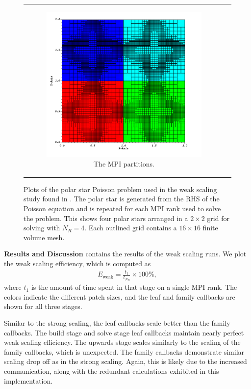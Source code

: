 \begin{figure}
\begin{tabular}{c c}
\begin{subfigure}[t]{0.45\textwidth}
            \includegraphics[width=\textwidth, clip=True, trim={0 0 0 0}]{figures/weak-scaling-partitions.png}
            \caption{The MPI partitions.}
            \label{subfig:polar-star-partitions}
        \end{subfigure}
    \end{tabular}
    \caption{Plots of the polar star Poisson problem used in the weak scaling study found in . The polar star is generated from the RHS of the Poisson equation and is repeated for each MPI rank used to solve the problem. This shows four polar stars arranged in a $2 \times 2$ grid for solving with $N_R = 4$. Each outlined grid contains a $16 \times 16$ finite volume mesh.}
    \label{fig:polar-star-plots}
\end{figure}

{\bf Results and Discussion}
 contains the results of the weak scaling runs. We plot the weak scaling efficiency, which is computed as
\begin{align}
    E_{\text{weak}} = \frac{t_{1}}{t_{N_R}} \times 100 \%,
\end{align}
where $t_{1}$ is the amount of time spent in that stage on a single MPI rank. The colors indicate the different patch sizes, and the leaf and family callbacks are shown for all three stages.

Similar to the strong scaling, the leaf callbacks scale better than the family callbacks. The build stage and solve stage leaf callbacks maintain nearly perfect weak scaling efficiency. The upwards stage scales similarly to the scaling of the family callbacks, which is unexpected. The family callbacks demonstrate similar scaling drop off as in the strong scaling. Again, this is likely due to the increased communication, along with the redundant calculations exhibited in this implementation.

